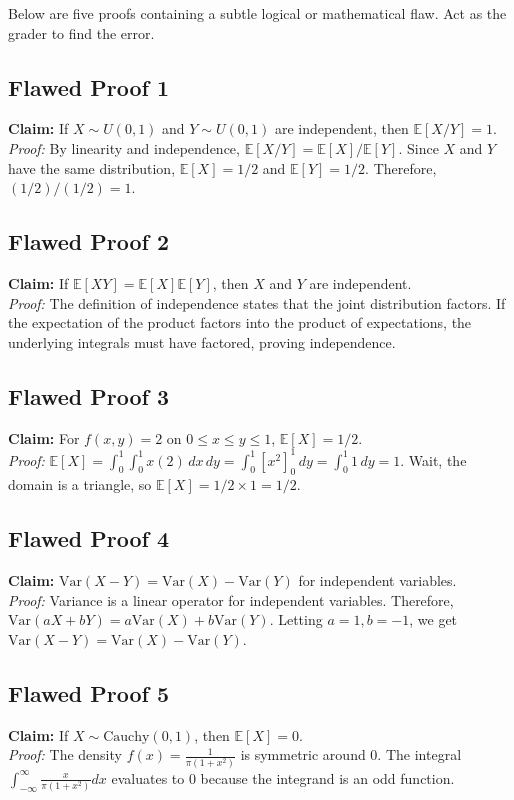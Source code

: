 \documentclass[11pt, a4paper]{article}
\theoremstyle{definition}
\theoremstyle{remark}
\newcommand{\E}{\mathbb{E}}
\newcommand{\Var}{\mathrm{Var}}
\begin{document}
Below are five proofs containing a subtle logical or mathematical flaw. Act as the grader to find the error.

\subsection{Flawed Proof 1}
\textbf{Claim:} If $X \sim U(0,1)$ and $Y \sim U(0,1)$ are independent, then $\E[X/Y] = 1$. \\ \relax
\textit{Proof:} By linearity and independence, $\E[X/Y] = \E[X] / \E[Y]$. Since $X$ and $Y$ have the same distribution, $\E[X] = 1/2$ and $\E[Y] = 1/2$. Therefore, $(1/2)/(1/2) = 1$.

\subsection{Flawed Proof 2}
\textbf{Claim:} If $\E[XY] = \E[X]\E[Y]$, then $X$ and $Y$ are independent. \\ \relax
\textit{Proof:} The definition of independence states that the joint distribution factors. If the expectation of the product factors into the product of expectations, the underlying integrals must have factored, proving independence.

\subsection{Flawed Proof 3}
\textbf{Claim:} For $f(x,y) = 2$ on $0 \leq x \leq y \leq 1$, $\E[X] = 1/2$. \\ \relax
\textit{Proof:} $\E[X] = \int_0^1 \int_0^1 x (2) \, dx \, dy = \int_0^1 [x^2]_0^1 \, dy = \int_0^1 1 \, dy = 1$. Wait, the domain is a triangle, so $\E[X] = 1/2 \times 1 = 1/2$.

\subsection{Flawed Proof 4}
\textbf{Claim:} $\Var(X - Y) = \Var(X) - \Var(Y)$ for independent variables. \\ \relax
\textit{Proof:} Variance is a linear operator for independent variables. Therefore, $\Var(aX + bY) = a\Var(X) + b\Var(Y)$. Letting $a=1, b=-1$, we get $\Var(X - Y) = \Var(X) - \Var(Y)$.

\subsection{Flawed Proof 5}
\textbf{Claim:} If $X \sim \text{Cauchy}(0,1)$, then $\E[X] = 0$. \\ \relax
\textit{Proof:} The density $f(x) = \frac{1}{\pi(1+x^2)}$ is symmetric around 0. The integral $\int_{-\infty}^\infty \frac{x}{\pi(1+x^2)} dx$ evaluates to 0 because the integrand is an odd function.
\end{document}
